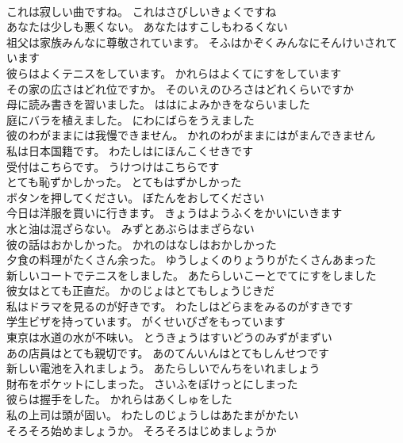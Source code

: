 \documentclass[8pt]{extreport}
\begin{document}
\begin{CJK}{UTF8}{min}
\\	これは寂しい曲ですね。	これはさびしいきょくですね 
\\	あなたは少しも悪くない。	あなたはすこしもわるくない 
\\	祖父は家族みんなに尊敬されています。	そふはかぞくみんなにそんけいされています 
\\	彼らはよくテニスをしています。	かれらはよくてにすをしています 
\\	その家の広さはどれ位ですか。	そのいえのひろさはどれくらいですか 
\\	母に読み書きを習いました。	ははによみかきをならいました 
\\	庭にバラを植えました。	にわにばらをうえました 
\\	彼のわがままには我慢できません。	かれのわがままにはがまんできません 
\\	私は日本国籍です。	わたしはにほんこくせきです 
\\	受付はこちらです。	うけつけはこちらです 
\\	とても恥ずかしかった。	とてもはずかしかった 
\\	ボタンを押してください。	ぼたんをおしてください 
\\	今日は洋服を買いに行きます。	きょうはようふくをかいにいきます 
\\	水と油は混ざらない。	みずとあぶらはまざらない 
\\	彼の話はおかしかった。	かれのはなしはおかしかった 
\\	夕食の料理がたくさん余った。	ゆうしょくのりょうりがたくさんあまった 
\\	新しいコートでテニスをしました。	あたらしいこーとでてにすをしました 
\\	彼女はとても正直だ。	かのじょはとてもしょうじきだ 
\\	私はドラマを見るのが好きです。	わたしはどらまをみるのがすきです 
\\	学生ビザを持っています。	がくせいびざをもっています 
\\	東京は水道の水が不味い。	とうきょうはすいどうのみずがまずい 
\\	あの店員はとても親切です。	あのてんいんはとてもしんせつです 
\\	新しい電池を入れましょう。	あたらしいでんちをいれましょう 
\\	財布をポケットにしまった。	さいふをぽけっとにしまった 
\\	彼らは握手をした。	かれらはあくしゅをした 
\\	私の上司は頭が固い。	わたしのじょうしはあたまがかたい 
\\	そろそろ始めましょうか。	そろそろはじめましょうか 

\end{CJK}
\end{document}
